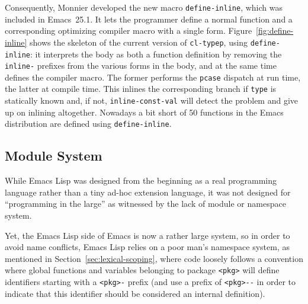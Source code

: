 \documentclass[format=acmsmall,screen]{acmart}
\newcommand \Elisp {Emacs Lisp}
\begin{document}
Consequently, Monnier developed the new macro \texttt{define-inline}, which
was included in Emacs~25.1.  It lets the programmer define a normal function
and a corresponding optimizing compiler macro with a single form.
Figure~\ref{fig:define-inline} shows the skeleton of the current version of
\texttt{cl-typep}, using \texttt{define-inline}: it interprets the
body as both a function definition by removing the
\texttt{inline-} prefixes from the various forms in the body, and at the same
time defines the compiler macro.
The former performs the \texttt{pcase}
dispatch at run time, the latter at compile time.  This inlines the
corresponding branch if \texttt{type} is
statically known and, if not, \texttt{inline-const-val} will detect
the problem and give up on inlining altogether.  Nowadays a bit short of 50
functions in the Emacs distribution are defined using
\texttt{define-inline}.



\subsection{Module System}
\label{sec:module-system}

While \Elisp{} was designed from the beginning as a real programming
language rather than a tiny ad-hoc extension language, it was not designed
for ``programming in the large'' as witnessed by the lack of module or
namespace system.

Yet, the \Elisp{} side of Emacs is now a rather large system, so in order to
avoid name conflicts, \Elisp{} relies on a poor man's namespace system, as
mentioned in Section~\ref{sec:lexical-scoping}, where code loosely follows
a convention where global functions and variables belonging to package
\verb|<pkg>| will define identifiers starting with a \verb|<pkg>-|
prefix (and use a prefix of \verb|<pkg>--| in order to indicate that this
identifier should be considered an internal definition).
\end{document}

